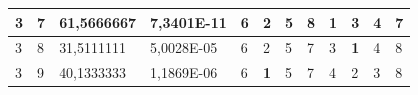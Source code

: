 \documentclass[conference]{IEEEtran}
\begin{document}
\begin{table}[]
\begin{tabular}{|llll|llllllll|}
\multicolumn{1}{|l|}{3}                                                     & \multicolumn{1}{l|}{7}                                                        & \multicolumn{1}{l|}{61,5666667}                                                   & 7,3401E-11                     & \multicolumn{1}{l|}{6}                                                  & \multicolumn{1}{l|}{2}                                                  & \multicolumn{1}{l|}{5}                                                  & \multicolumn{1}{l|}{8}                                                  & \multicolumn{1}{l|}{\textbf{1}}                                         & \multicolumn{1}{l|}{3}                                                  & \multicolumn{1}{l|}{4}                                                  & 7                          \\ \hline
\multicolumn{1}{|l|}{3}                                                     & \multicolumn{1}{l|}{8}                                                        & \multicolumn{1}{l|}{31,5111111}                                                   & 5,0028E-05                     & \multicolumn{1}{l|}{6}                                                  & \multicolumn{1}{l|}{2}                                                  & \multicolumn{1}{l|}{5}                                                  & \multicolumn{1}{l|}{7}                                                  & \multicolumn{1}{l|}{3}                                                  & \multicolumn{1}{l|}{\textbf{1}}                                         & \multicolumn{1}{l|}{4}                                                  & 8                          \\ \hline
\multicolumn{1}{|l|}{3}                                                     & \multicolumn{1}{l|}{9}                                                        & \multicolumn{1}{l|}{40,1333333}                                                   & 1,1869E-06                     & \multicolumn{1}{l|}{6}                                                  & \multicolumn{1}{l|}{\textbf{1}}                                         & \multicolumn{1}{l|}{5}                                                  & \multicolumn{1}{l|}{7}                                                  & \multicolumn{1}{l|}{4}                                                  & \multicolumn{1}{l|}{2}                                                  & \multicolumn{1}{l|}{3}                                                  & 8                          \\ \hline

\end{tabular}
\end{table}
\end{document}
